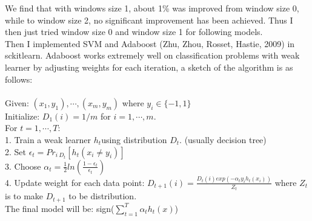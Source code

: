 \documentclass[paper=a4, fontsize=11pt]{scrartcl} %
\numberwithin{equation}{section} %
\numberwithin{figure}{section} %
\numberwithin{table}{section} %
\begin{document}
We find that with windows size 1, about 1\% was improved from window size 0, while to window size 2, no significant improvement has been achieved. Thus I then just tried window size 0 and window size 1 for following models.\\
Then I implemented SVM and Adaboost (Zhu, Zhou, Rosset, Hastie, 2009) in sckitlearn.  Adaboost works extremely well on  classification problems with weak learner by adjusting weights for each iteration, a sketch of the algorithm is as follows: \\
\ \\
Given: $(x_1, y_1), \cdots, (x_m, y_m)$ where $y_i \in \{ -1, 1 \}$\\
Initialize: $D_1(i)=1/m$ for $i=1, \cdots, m$. \\
For $t=1, \cdots, T$: \\
1. Train a weak learner $h_t $using distribution $D_t$. (usually decision tree) \\
2. Set $\epsilon_t=Pr_{i~D_t}[h_t(x_i\neq y_i)]$ \\
3. Choose $\alpha_t=\frac{1}{2}ln(\frac{1-\epsilon_t}{\epsilon_t})$ \\
4. Update weight for each data point: $D_{t+1}(i)=\frac{D_t(i)exp(-\alpha_t y_i h_t(x_i))}{Z_t}$ where $Z_t$ is to make $D_{t+1}$ to be distribution.\\
The final model will be: sign($\sum_{t=1}^T \alpha_t h_t(x)$)
\ \\
\end{document}

